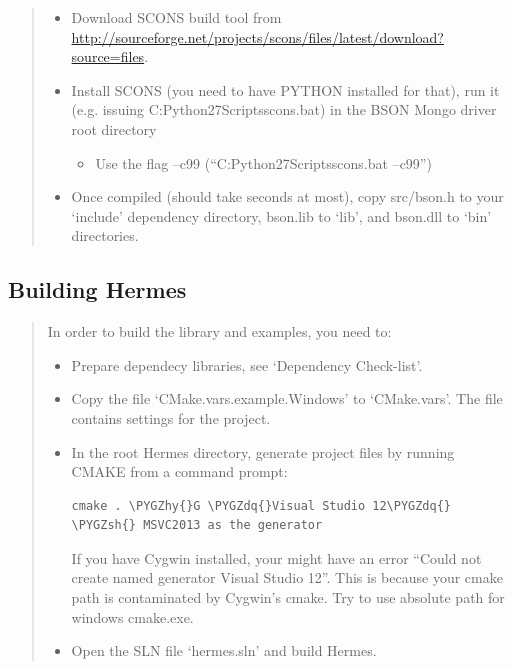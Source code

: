 \documentclass[a4paper,0pt,english]{sphinxmanual}
\def\PYGZsh{\char`\#}
\def\PYGZhy{\char`\-}
\def\PYGZdq{\char`\"}
\begin{document}
\begin{quote}
\begin{itemize}
\begin{itemize}
\begin{itemize}
\item {} 
Download SCONS build tool from \href{http://sourceforge.net/projects/scons/files/latest/download?source=files}{http://sourceforge.net/projects/scons/files/latest/download?source=files}.

\item {} 
Install SCONS (you need to have PYTHON installed for that), run it (e.g. issuing C:Python27Scriptsscons.bat) in the BSON Mongo driver root directory
\begin{itemize}
\item {} 
Use the flag --c99 (``C:Python27Scriptsscons.bat --c99'')

\end{itemize}

\item {} 
Once compiled (should take seconds at most), copy src/bson.h to your `include' dependency directory, bson.lib to `lib', and bson.dll to `bin' directories.

\end{itemize}

\end{itemize}

\end{itemize}
\end{quote}


\subsection{Building Hermes}
\label{src/installation/win:building-hermes}\begin{quote}

In order to build the library and examples, you need to:
\begin{itemize}
\item {} 
Prepare dependecy libraries, see `Dependency Check-list'.

\item {} 
Copy the file `CMake.vars.example.Windows' to `CMake.vars'. The file contains settings for the project.

\item {} 
In the root Hermes directory, generate project files by running CMAKE from a command prompt:

\begin{Verbatim}[commandchars=\\\{\}]
cmake . \PYGZhy{}G \PYGZdq{}Visual Studio 12\PYGZdq{}      \PYGZsh{} MSVC2013 as the generator
\end{Verbatim}

If you have Cygwin installed, your might have an error ``Could not create named generator Visual Studio 12''. This is because your
cmake path is contaminated by Cygwin's cmake. Try to use absolute path for windows cmake.exe.

\item {} 
Open the SLN file `hermes.sln' and build Hermes.

\end{itemize}
\end{quote}
\end{document}
